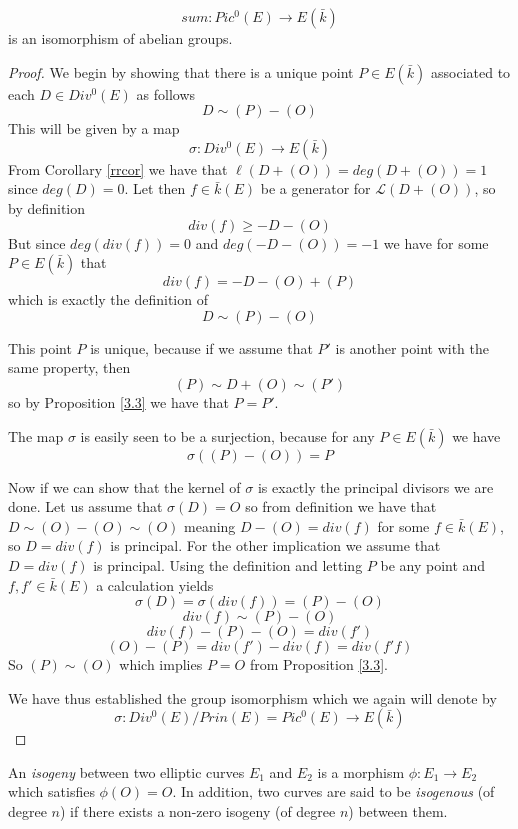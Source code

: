 \begin{thm} \label{isoteorem}
 $$ sum: Pic^0(E) \rightarrow E(\bar{k}) $$
is an isomorphism of abelian groups.
\end{thm}
\begin{proof}
 We begin by showing that there is a unique point $P \in E(\bar{k})$ associated to
each $D \in Div^0(E)$ as follows
$$ D \sim (P) -(O) $$
This will be given by a map
$$ \sigma: Div^0(E) \rightarrow E(\bar{k}) $$
From Corollary \ref{rrcor} we have that $\ell(D+(O)) = deg(D+(O)) = 1$ since $deg(D) = 0$.
Let then $f \in \bar{k}(E)$ be a generator for $\mathscr{L}(D+(O))$, so by definition
$$ div(f) \geq -D-(O) $$
But since $deg(div(f)) = 0$ and $deg(-D-(O)) = -1$ we have for some $P \in E(\bar{k})$ that
$$ div(f) = -D-(O)+(P) $$
which is exactly the definition of
$$ D \sim (P) - (O) $$

This point $P$ is unique, because if we assume that $P'$ is another point with the same
property, then
$$ (P) \sim D + (O) \sim (P') $$
so by Proposition \ref{3.3} we have that $ P = P'$.

The map $\sigma$ is easily seen to be a surjection, because for any $P \in E(\bar{k})$ we have
$$ \sigma((P)-(O)) = P $$

Now if we can show that the kernel of $\sigma$ is exactly the principal divisors we are done.
Let us assume that $\sigma(D) = O$ so from definition we have that $D \sim (O)-(O) \sim (O)$
meaning $D - (O) = div(f)$ for some $f \in \bar{k}(E)$, so $D = div(f)$ is principal.
For the other implication we assume that $D = div(f)$ is principal. Using the definition and
letting $P$ be any point and $f, f' \in \bar{k}(E)$ a calculation yields
$$ \sigma(D) = \sigma(div(f)) = (P)-(O) $$
$$ div(f) \sim (P) - (O) $$
$$ div(f) - (P) - (O) = div(f') $$
$$ (O) - (P) = div(f') - div(f) = div(f' f) $$
So $ (P) \sim (O) $ which implies $P = O$ from Proposition \ref{3.3}.

We have thus established the group isomorphism which we again will denote by
$$ \sigma : Div^0(E)/Prin(E) = Pic^0(E) \rightarrow E(\bar{k}) $$

\end{proof}

\begin{mydef}
 An \emph{isogeny} between two elliptic curves $E_1$ and $E_2$ is a morphism $\phi: E_1 \rightarrow E_2$
which satisfies $\phi(O) = O$. In addition, two curves are said to be \emph{isogenous} (of degree $n$) 
if there exists a non-zero isogeny (of degree $n$) between them.
\end{mydef}

